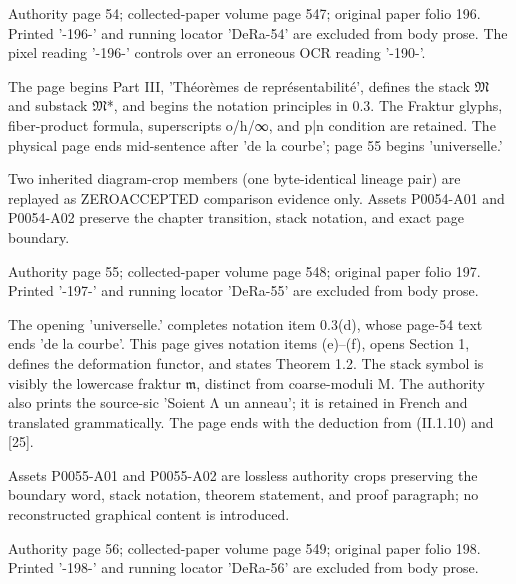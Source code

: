 \documentclass[11pt,a4paper]{article}
\begin{document}
\par\medskip
\hypertarget{D018-P0054}{}
\par\smallskip
Authority page 54; collected-paper volume page 547; original paper folio 196. Printed '-196-' and running locator 'DeRa-54' are excluded from body prose. The pixel reading '-196-' controls over an erroneous OCR reading '-190-'.

The page begins Part III, 'Théorèmes de représentabilité', defines the stack \ensuremath{\mathfrak{M}} and substack \ensuremath{\mathfrak{M}}\textunderscore{}*, and begins the notation principles in 0.3. The Fraktur glyphs, fiber-product formula, superscripts o/h/∞, and p|n condition are retained. The physical page ends mid-sentence after 'de la courbe'; page 55 begins 'universelle.'

Two inherited diagram-crop members (one byte-identical lineage pair) are replayed as ZERO\textunderscore{}ACCEPTED comparison evidence only. Assets P0054-A01 and P0054-A02 preserve the chapter transition, stack notation, and exact page boundary.


\par\medskip
\hypertarget{D018-P0055}{}
\par\smallskip
Authority page 55; collected-paper volume page 548; original paper folio 197. Printed '-197-' and running locator 'DeRa-55' are excluded from body prose.

The opening 'universelle.' completes notation item 0.3(d), whose page-54 text ends 'de la courbe'. This page gives notation items (e)--(f), opens Section 1, defines the deformation functor, and states Theorem 1.2. The stack symbol is visibly the lowercase fraktur \ensuremath{\mathfrak{m}}, distinct from coarse-moduli M. The authority also prints the source-sic 'Soient Λ un anneau'; it is retained in French and translated grammatically. The page ends with the deduction from (II.1.10) and [25].

Assets P0055-A01 and P0055-A02 are lossless authority crops preserving the boundary word, stack notation, theorem statement, and proof paragraph; no reconstructed graphical content is introduced.


\par\medskip
\hypertarget{D018-P0056}{}
\par\smallskip
Authority page 56; collected-paper volume page 549; original paper folio 198. Printed '-198-' and running locator 'DeRa-56' are excluded from body prose.
\end{document}

